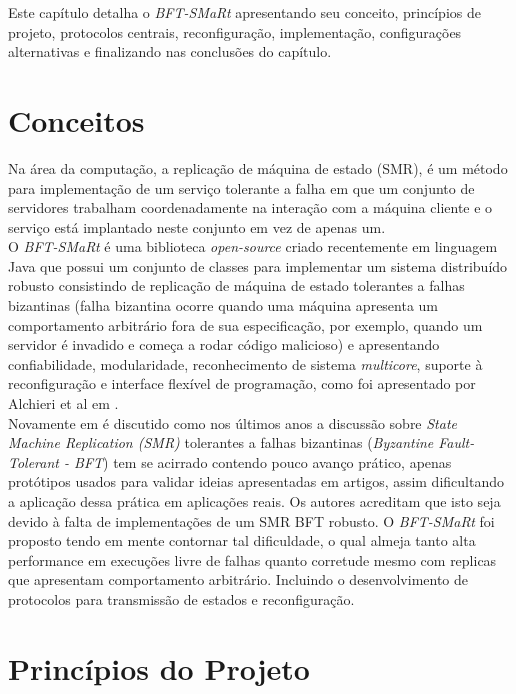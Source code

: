 Este capítulo detalha o \textit{BFT-SMaRt} apresentando seu conceito, princípios de projeto, protocolos centrais, reconfiguração, implementação, configurações alternativas e finalizando nas conclusões do capítulo.


	\section{Conceitos}
	Na área da computação, a  replicação de máquina de estado (SMR), é um método para implementação de um serviço tolerante a falha em que um conjunto de servidores trabalham coordenadamente na interação com a máquina cliente e o serviço está implantado neste conjunto em vez de  apenas um. \\
	
	O \textit{BFT-SMaRt} é uma biblioteca \textit{open-source} criado recentemente em linguagem Java que possui um conjunto de classes para implementar um sistema distribuído robusto consistindo de replicação de máquina de estado tolerantes a falhas bizantinas (falha bizantina ocorre quando uma máquina apresenta um comportamento arbitrário fora de sua especificação, por exemplo, quando um servidor é invadido e começa a rodar código malicioso) e apresentando confiabilidade, modularidade, reconhecimento de sistema \textit{multicore}, suporte à reconfiguração e interface flexível de programação, como foi apresentado por Alchieri et al em \cite{bessani3}. \\
	
	Novamente em \cite{bessani3} é discutido como nos últimos anos a discussão sobre \textit{State Machine Replication (SMR)} tolerantes a falhas bizantinas (\textit{Byzantine Fault-Tolerant - BFT}) tem se acirrado contendo pouco avanço prático, apenas protótipos usados para validar ideias apresentadas em artigos, assim dificultando a aplicação dessa prática em aplicações reais. Os autores acreditam que isto seja devido à falta de implementações de um SMR BFT robusto. O \textit{BFT-SMaRt} foi proposto tendo em mente contornar tal dificuldade, o qual almeja tanto alta performance em execuções livre de falhas quanto corretude mesmo com replicas que apresentam comportamento arbitrário. Incluindo o desenvolvimento de protocolos para transmissão de estados e reconfiguração. \\
	
	\section{Princípios do Projeto}
	
